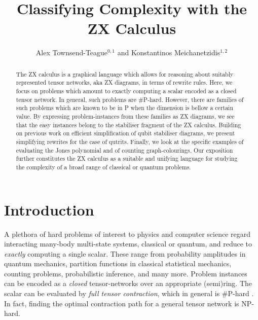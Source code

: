 \documentclass[submission,copyright,creativecommons]{eptcs}
\title{Classifying Complexity with the ZX Calculus}
\author{  Alex Townsend-Teague$^{0,1}$ and Konstantinos Meichanetzidis$^{1,2}$
\institute{$^0$ Mathematical Institute, University of Oxford}
\institute{$^1$ Department of Computer Science, University of Oxford}
\institute{$^2$ Cambridge Quantum Computing Ltd.} }
\begin{document}
\maketitle
\begin{abstract}
The ZX calculus is a graphical language which allows for reasoning about suitably represented tensor networks, aka ZX diagrams,
in terms of rewrite rules.
Here, we focus on problems which amount to exactly computing
a scalar encoded as a closed tensor network.
In general, such problems are \#P-hard.
However, there are families of such problems which are known to be in P
when the dimension is bellow a certain value.
By expressing problem-instances from these families as ZX diagrams,
we see that the easy instances belong to the stabiliser fragment of the ZX calculus.
Building on previous work on efficient simplification of qubit stabiliser diagrams, we present simplifying rewrites for the case of qutrits.
Finally, we look at the specific examples of evaluating the Jones polynomial
and of counting graph-colourings.
Our exposition further constitutes the ZX calculus as a suitable and unifying language for studying the complexity of
a broad range of classical or quantum problems.
\end{abstract}

\section{Introduction}


A plethora of hard problems of interest to physics and computer science
regard interacting many-body multi-state systems, classical or quantum,
and reduce to \emph{exactly} computing a single scalar.
These range from probability amplitudes in quantum mechanics,
partition functions in classical statistical mechanics,
counting problems, probabilistic inference, and many more.
Problem instances can be encoded as a \emph{closed}
tensor-networks over an appropriate (semi)ring.
The scalar can be evaluated by \emph{full tensor contraction},
which in general is \#P-hard \cite{Damm2002}.
In fact, finding the optimal contraction path for a general tensor network is NP-hard.
\end{document}
